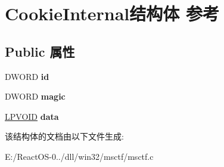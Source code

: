 \hypertarget{struct_cookie_internal}{}\section{Cookie\+Internal结构体 参考}
\label{struct_cookie_internal}
\subsection*{Public 属性}
\begin{DoxyCompactItemize}
\item 
\mbox{\label{struct_cookie_internal_a8253ee370a1fcc7c39d85c1c5b27044a}} 
D\+W\+O\+RD {\bfseries id}
\item 
\mbox{\label{struct_cookie_internal_aed1da70dd5d4f9b95aea7e4ec4c52de6}} 
D\+W\+O\+RD {\bfseries magic}
\item 
\mbox{\label{struct_cookie_internal_add251e4e724c4d28aa46323ee7dceaed}} 
\hyperlink{interfacevoid}{L\+P\+V\+O\+ID} {\bfseries data}
\end{DoxyCompactItemize}


该结构体的文档由以下文件生成\+:\begin{DoxyCompactItemize}
\item 
E\+:/\+React\+O\+S-\/0../dll/win32/msctf/msctf.\+c\end{DoxyCompactItemize}
